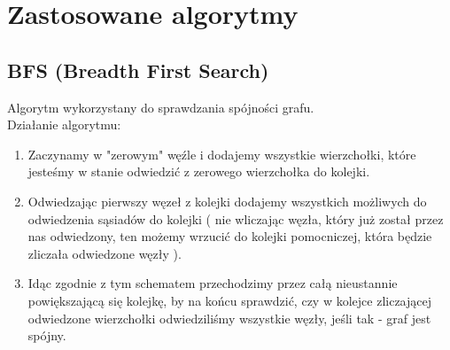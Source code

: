 \documentclass{article}
\begin{document}
\section{Zastosowane algorytmy}
\subsection{BFS (Breadth First Search)}
Algorytm wykorzystany do sprawdzania spójności grafu. \\
Działanie algorytmu:
\begin{enumerate}
    \item Zaczynamy w "zerowym" węźle i dodajemy wszystkie wierzchołki, które jesteśmy w stanie odwiedzić z zerowego wierzchołka do kolejki.
    \item Odwiedzając pierwszy węzeł z kolejki dodajemy wszystkich możliwych do odwiedzenia sąsiadów do kolejki ( nie wliczając węzła, który już został przez nas odwiedzony, ten możemy wrzucić do kolejki pomocniczej, która będzie zliczała odwiedzone węzły ).
    \item Idąc zgodnie z tym schematem przechodzimy przez całą nieustannie powiększającą się kolejkę, by na końcu sprawdzić, czy w kolejce zliczającej odwiedzone wierzchołki odwiedziliśmy wszystkie węzły, jeśli tak - graf jest spójny.

\end{enumerate}
\end{document}
